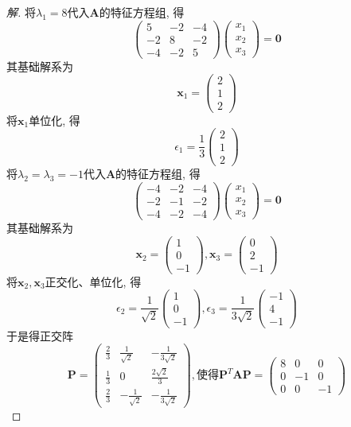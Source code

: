 \documentclass[10pt,a4paper]{report}
\def\*#1{\mathbf{#1}}
\begin{document}
\begin{proof}[解]
	将$\lambda_1 = 8$代入$\*A$的特征方程组, 得
	\[\begin{pmatrix}
	5 & -2 & -4 \\
	-2 & 8 & -2 \\
	-4 & -2 & 5
	\end{pmatrix}
	\begin{pmatrix}
	x_1 \\
	x_2 \\
	x_3
	\end{pmatrix} = \*0\]
	其基础解系为
	\[\*x_1 = \begin{pmatrix}
	2 \\
	1 \\
	2
	\end{pmatrix}\]
	将$\*x_1$单位化, 得
	\[\epsilon_1 = \frac{1}{3}\begin{pmatrix}
	2 \\
	1 \\
	2
	\end{pmatrix}\]
	将$\lambda_2 = \lambda_3 = -1$代入$\*A$的特征方程组, 得
	\[\begin{pmatrix}
	-4 & -2 & -4 \\
	-2 & -1 & -2 \\
	-4 & -2 & -4 
	\end{pmatrix}
	\begin{pmatrix}
	x_1 \\
	x_2 \\
	x_3
	\end{pmatrix} = \*0 \]
	其基础解系为
	\[\*x_2 = \begin{pmatrix}
	1 \\
	0 \\
	-1
	\end{pmatrix}, 
	\*x_3 = \begin{pmatrix}
	0 \\
	2 \\
	-1
	\end{pmatrix}\]
	将$\*x_2, \*x_3$正交化、单位化, 得
	\[\epsilon_2 = \frac{1}{\sqrt{2}}\begin{pmatrix}
	1 \\
	0 \\
	-1
	\end{pmatrix}, \epsilon_3 = \frac{1}{3\sqrt{2}}\begin{pmatrix}
	-1 \\
	4 \\
	-1
	\end{pmatrix}\]
	于是得正交阵
	\[ \*P = \begin{pmatrix}
	\frac{2}{3} & \frac{1}{\sqrt{2}} & -\frac{1}{3\sqrt{2}} \\
	\frac{1}{3} & 0 & \frac{2\sqrt{2}}{3} \\
	\frac{2}{3} & -\frac{1}{\sqrt{2}} & -\frac{1}{3\sqrt{2}}
	\end{pmatrix}, \text{使得}\*P^T\*A\*P = \begin{pmatrix}
	8 & 0 & 0 \\
	0 & -1 & 0 \\
	0 & 0 & -1
	\end{pmatrix}\]
\end{proof}
\end{document}
